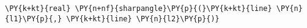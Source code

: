\begin{Verbatim}[commandchars=\\\{\}]
    \PY{k+kt}{real} \PY{n+nf}{sharpangle}\PY{p}{(}\PY{k+kt}{line} \PY{n}{l1}\PY{p}{,} \PY{k+kt}{line} \PY{n}{l2}\PY{p}{)}
\end{Verbatim}
